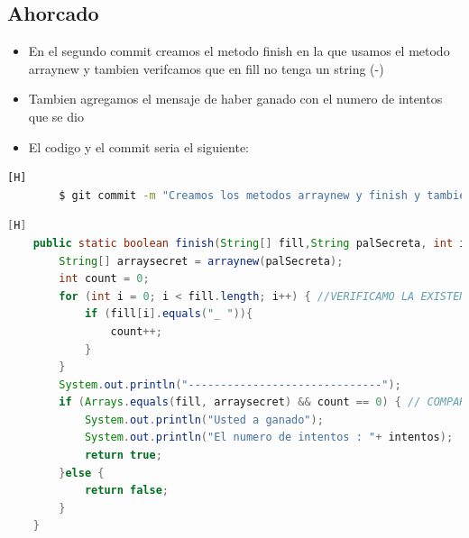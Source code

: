 \documentclass{article}
\begin{document}
	\subsection{Ahorcado}
	\begin{itemize}	
		\item En el segundo commit creamos el metodo finish en la que usamos el metodo arraynew y tambien verifcamos que en fill no tenga un string (-)
		\item Tambien agregamos el mensaje de haber ganado con el numero de intentos que se dio 
		\item El codigo y el commit seria el siguiente:
	\end{itemize}
	\begin{lstlisting}[language=bash,caption={Commit}][H]
		$ git commit -m "Creamos los metodos arraynew y finish y tambien ponemos una estructura de control en el ciclo while"
	\end{lstlisting}
	\begin{lstlisting}[language=java,caption={Las lineas de codigo de lo creado:}][H]
	public static boolean finish(String[] fill,String palSecreta, int intentos){//METODO CREADO PARA SABER SI GANO Y CUANTOS INTENTOS USO
        String[] arraysecret = arraynew(palSecreta);
        int count = 0;
        for (int i = 0; i < fill.length; i++) { //VERIFICAMO LA EXISTENCIA DE UN "_ "
            if (fill[i].equals("_ ")){
                count++;
            }
        }
        System.out.println("------------------------------");
        if (Arrays.equals(fill, arraysecret) && count == 0) { // COMPARAMOS LOS ARRAY Y VERIFICAMOS SI SON IGUALES Y QUE NO EXISTA UN "_ "
            System.out.println("Usted a ganado");
            System.out.println("El numero de intentos : "+ intentos);
            return true;
        }else {
            return false;
        }
    }
	\end{lstlisting}	
\end{document}
